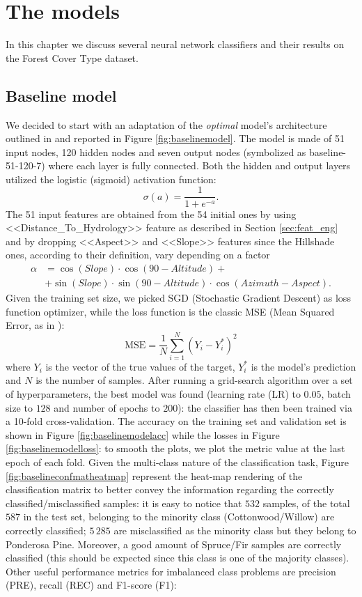 \chapter{The models}
In this chapter we discuss several neural network classifiers and their results on the Forest Cover Type dataset.
\section{Baseline model}
\label{sec:baselinemodel}
We decided to start with an adaptation of the \textit{optimal} model's architecture outlined in \cite{blackardDean} and reported in Figure \ref{fig:baselinemodel}. The model is made of 51 input nodes, 120 hidden nodes and seven output nodes (symbolized as baseline-51-120-7) where each layer is fully connected. Both the hidden and output layers utilized the logistic (sigmoid) activation function:
$$
\sigma(a) = \frac{1}{1 + e^{-a}}.
$$
The 51 input features are obtained from the 54 initial ones by using <<Distance\_To\_Hydrology>> feature as described in Section \ref{sec:feat_eng} and by dropping <<Aspect>> and <<Slope>> features since the Hillshade ones, according to their definition, vary depending on a factor
\begin{equation}
\begin{aligned}
\alpha&=\cos(Slope)\cdot \cos(90-Altitude)+ \\
& +\sin(Slope) \cdot \sin(90-Altitude)\cdot \cos(Azimuth-Aspect).
\end{aligned}
\end{equation}
Given the training set size, we picked SGD (Stochastic Gradient Descent) as loss function optimizer, while the loss function is the classic MSE (Mean Squared Error, as in \cite{blackardDean}):
\begin{equation}
\text{MSE} = \frac{1}{N}\sum_{i=1}^{N}(Y_i - Y^{*}_{i})^2
\end{equation}
where $Y_i$ is the vector of the true values of the target, $Y^{*}_{i}$ is the model's prediction and $N$ is the number of samples. After running a grid-search algorithm over a set of hyperparameters, the best model was found (learning rate (LR) to $0.05$, batch size to $128$ and number of epochs to $200$): the classifier has then been trained via a 10-fold cross-validation. The accuracy on the training set and validation set is shown in Figure \ref{fig:baselinemodelacc} while the losses in Figure \ref{fig:baselinemodelloss}: to smooth the plots, we plot the metric value at the last epoch of each fold. Given the multi-class nature of the classification task, Figure \ref{fig:baselineconfmatheatmap} represent the heat-map rendering of the classification matrix to better convey the information regarding the correctly classified/misclassified samples: it is easy to notice that $532$ samples, of the total $587$ in the test set, belonging to the minority class (Cottonwood/Willow) are correctly classified; $5\,285$ are misclassified as the minority class but they belong to Ponderosa Pine. Moreover, a good amount of Spruce/Fir samples are correctly classified (this should be expected since this class is one of the majority classes). Other useful performance metrics for imbalanced class problems are precision (PRE), recall (REC) and F1-score (F1):
